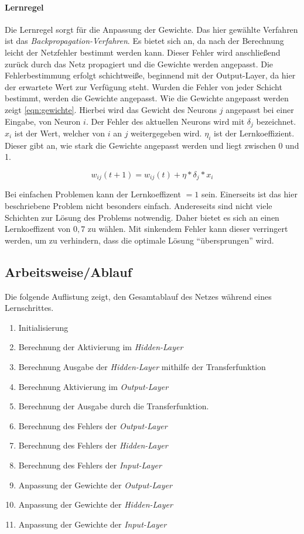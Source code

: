 \paragraph{Lernregel}
Die Lernregel sorgt für die Anpassung der Gewichte. Das hier gewählte
Verfahren ist das \textit{Backpropagation-Verfahren}.
Es bietet sich an, da nach der Berechnung leicht der Netzfehler bestimmt werden kann.
Dieser Fehler wird anschließend zurück durch das Netz propagiert und die Gewichte
werden angepasst. Die Fehlerbestimmung erfolgt schichtweiße, beginnend mit der Output-Layer,
da hier der erwartete Wert zur Verfügung steht. Wurden die Fehler von jeder
Schicht bestimmt, werden die Gewichte angepasst.
Wie die Gewichte angepasst werden zeigt \autoref{eqn:gewichte}.
Hierbei wird das Gewicht des Neurons $j$ angepasst bei einer Eingabe,
von Neuron $i$. Der Fehler des aktuellen Neurons wird mit $\delta_j$ bezeichnet.
$x_i$ ist der Wert, welcher von $i$ an $j$ weitergegeben wird.
$\eta_i$ ist der Lernkoeffizient.
Dieser gibt an, wie stark die Gewichte angepasst werden und liegt zwischen 0 und 1.

\begin{equation}
    w_{ij}(t+1) = w_{ij}(t) + \eta * \delta_j*x_i
    \label{eqn:gewichte}
\end{equation}

Bei einfachen Problemen kann der Lernkoeffizent $=1$ sein.
Einerseits ist das hier beschriebene Problem nicht besonders einfach.
Andereseits sind nicht viele Schichten zur Lösung des Problems notwendig.
Daher bietet es sich an einen Lernkoeffizent von $0,7$ zu wählen.
Mit sinkendem Fehler kann dieser verringert werden,
um zu verhindern, dass die optimale Lösung \enquote{übersprungen} wird.

\subsection{Arbeitsweise/Ablauf}
Die folgende Auflistung zeigt, den Gesamtablauf des Netzes während eines
Lernschrittes.
\begin{enumerate}
    \item Initialisierung
    \item Berechnung der Aktivierung im \textit{Hidden-Layer}
    \item Berechnung Ausgabe der \textit{Hidden-Layer} mithilfe der Transferfunktion
    \item Berechnung Aktivierung im \textit{Output-Layer}
    \item Berechnung der Ausgabe durch die Transferfunktion.
    \item Berechnung des Fehlers der \textit{Output-Layer}
    \item Berechnung des Fehlers der \textit{Hidden-Layer}
    \item Berechnung des Fehlers der \textit{Input-Layer}
    \item Anpassung der Gewichte der \textit{Output-Layer}
    \item Anpassung der Gewichte der \textit{Hidden-Layer}
    \item Anpassung der Gewichte der \textit{Input-Layer}
\end{enumerate}